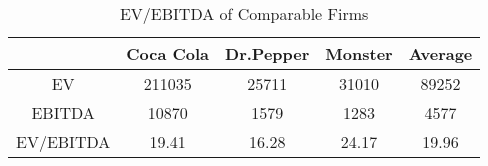 \begin{table}[ht]
\centering
\begin{tabular}{@{}ccccc@{}}
\toprule
          & Coca Cola & Dr.Pepper & Monster & Average \\ \midrule
EV        & 211035    & 25711     & 31010   & 89252   \\
EBITDA    & 10870     & 1579      & 1283    & 4577    \\
EV/EBITDA & 19.41     & 16.28     & 24.17   & 19.96   \\ \bottomrule
\end{tabular}
\caption{EV/EBITDA of Comparable Firms}
\label{tab:part2-ev/ebitda}
\end{table}
